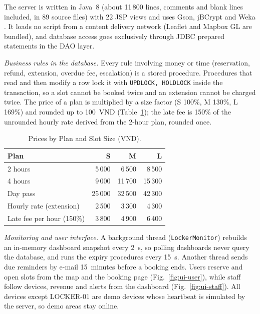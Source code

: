 \documentclass[journal,onecolumn]{IEEEtran}
\begin{document}
The server is written in Java~8 (about 11\,800 lines, comments and blank lines included, in 89 source files) with
22 JSP views and uses Gson, jBCrypt \cite{provos1999bcrypt} and Weka \cite{hall2009weka}. It loads no script from a
content delivery network (Leaflet and Mapbox GL are bundled), and database access goes exclusively through JDBC
prepared statements in the DAO layer.

\textit{Business rules in the database.} Every rule involving money or time (reservation, refund, extension,
overdue fee, escalation) is a stored procedure. Procedures that read and then modify a row lock it with
\texttt{UPDLOCK, HOLDLOCK} inside the transaction, so a slot cannot be booked twice and an extension cannot be charged
twice. The price of a plan is multiplied by a size factor (S 100\%, M 130\%, L 169\%) and rounded up to 100~VND
(Table~\ref{tab:price}); the late fee is 150\% of the unrounded hourly rate derived from the 2-hour plan, rounded once.

\begin{table}[!htbp]
\renewcommand{\arraystretch}{1.02}
\centering
\small
\caption{Prices by Plan and Slot Size (VND).}
\label{tab:price}
\vspace{5pt}
\begin{tabular}{l r r r}
\hline
Plan & S & M & L \\
\hline
\rule{0pt}{2.6ex}2 hours & 5\,000 & 6\,500 & 8\,500 \\
4 hours & 9\,000 & 11\,700 & 15\,300 \\
Day pass & 25\,000 & 32\,500 & 42\,300 \\
Hourly rate (extension) & 2\,500 & 3\,300 & 4\,300 \\
Late fee per hour (150\%) & 3\,800 & 4\,900 & 6\,400 \\
\hline
\end{tabular}
\end{table}

\textit{Monitoring and user interface.} A background thread (\texttt{LockerMonitor}) rebuilds an in-memory dashboard
snapshot every 2~s, so polling dashboards never query the database, and runs the expiry procedures every 15~s. Another thread sends due reminders by e-mail 15~minutes before a booking ends. Users
reserve and open slots from the map and the booking page (Fig.~\ref{fig:ui-user}), while staff follow devices, revenue
and alerts from the dashboard (Fig.~\ref{fig:ui-staff}). All devices except LOCKER-01 are demo devices whose
heartbeat is simulated by the server, so demo areas stay online.
\end{document}
